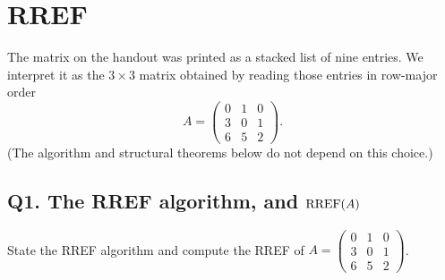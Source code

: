 \section{RREF}

The matrix on the handout was printed as a stacked list of nine entries. We
interpret it as the $3\times 3$ matrix obtained by reading those entries in
row-major order
\[
A=\begin{pmatrix}0&1&0\\3&0&1\\6&5&2\end{pmatrix}.
\]
(The algorithm and structural theorems below do not depend on this choice.)

\subsection{Q1. The RREF algorithm, and $\operatorname{RREF}(A)$}

\begin{promptbox}
State the RREF algorithm and compute the RREF of
$A=\begin{pmatrix}0&1&0\\3&0&1\\6&5&2\end{pmatrix}$.
\end{promptbox}

